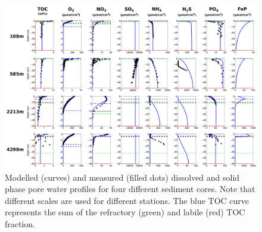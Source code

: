\documentclass[gmd, manuscript]{copernicus}
\begin{document}
\begin{figure}[htbp]
\begin{center}
	\includegraphics[width=1.0\textwidth]{figures/Profiles/0_ALL_PROFILES_COMBINED.pdf}
	\caption{Modelled (curves) and measured (filled dots) dissolved and solid phase pore water profiles for four different sediment cores. Note that different 
	scales are used for different stations. The blue TOC curve represents the sum of the refractory (green) and labile (red) TOC fraction.}
	\label{fig:Sediment_profiles}
	\end{center}
\end{figure}
\end{document}
